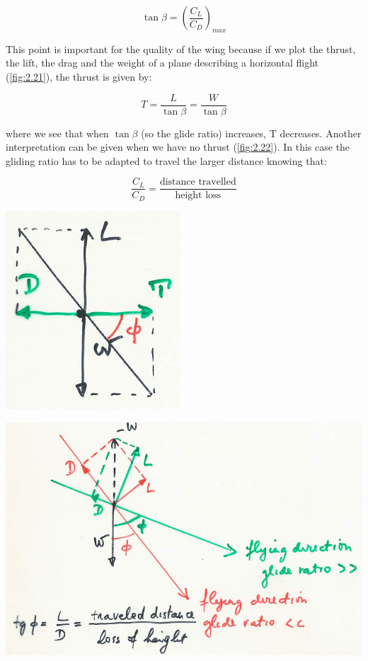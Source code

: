 			\begin{equation}
			\tan \beta = \left(\frac{C_L}{C_D}\right)_{max}
			\end{equation}						
			 
			This point is important for the quality of the wing because if we plot the thrust, the lift, the drag and the weight of a plane describing a horizontal flight (\autoref{fig:2.21}), the thrust is given by:
			
			\begin{equation}
			T = \frac{L}{\tan \beta} = \frac{W}{\tan \beta}
			\end{equation}
			
			where we see that when $\tan \beta$ (so the glide ratio) increases, T decreases. Another interpretation can be given when we have no thrust (\autoref{fig:2.22}). In this case the gliding ratio has to be adapted to travel the larger distance knowing that:
			
			\begin{equation}
			\frac{C_L}{C_D} = \frac{\mbox{distance travelled}}{\mbox{height loss}}
			\end{equation}
			
			\begin{center}
			\begin{minipage}{0.3\textwidth}
			\includegraphics[scale=0.5]{ch2/22}
			\label{fig:2.21}
			\end{minipage}
			\begin{minipage}{0.5\textwidth}
			\includegraphics[scale=0.2]{ch2/23}
			\label{fig:2.22}
			\end{minipage}
			\end{center}
			
